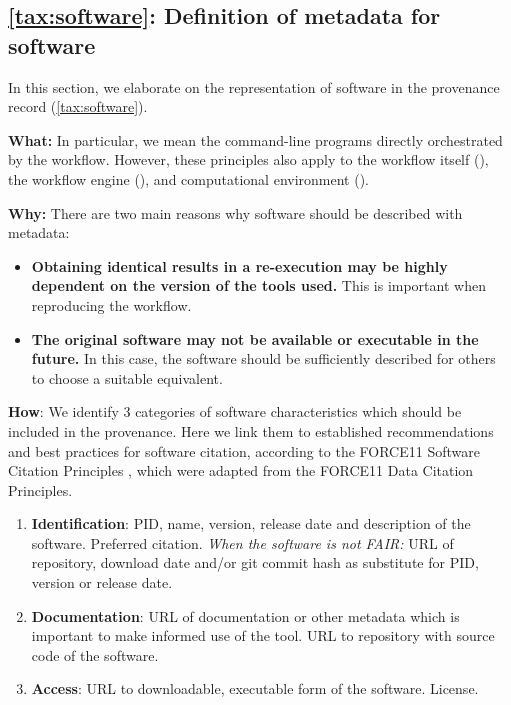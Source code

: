\subsection{\ref{tax:software}: Definition of metadata for software}
\label{sec:software_reqs}

In this section, we elaborate on the representation of software in the provenance record (\ref{tax:software}). 

\textbf{What:} In particular, we mean the command-line programs directly orchestrated by the workflow. However, these principles also apply to the workflow itself (), the workflow engine (), and computational environment ().

\textbf{Why:} There are two main reasons why software should be described with metadata:

\begin{itemize}
    \item \textbf{Obtaining identical results in a re-execution may be highly dependent on the version of the tools used.} This is important when reproducing the workflow. 
    \item \textbf{The original software may not be available or executable in the future.} In this case, the software should be sufficiently described for others to choose a suitable equivalent. 
\end{itemize}

\textbf{How}: We identify 3 categories of software characteristics which should be included in the provenance. Here we link them to established recommendations and best practices for software citation, according to the FORCE11 Software Citation Principles \cite{smithSoftwareCitationPrinciples2016}, which were adapted from the FORCE11 Data Citation Principles.

\begin{enumerate}[label=\textbf{SW\arabic*}]
    \item \textbf{Identification}: PID, name, version, release date and description of the software. Preferred citation. \textit{When the software is not FAIR:} URL of repository, download date and/or git commit hash as substitute for PID, version or release date. \label{req:sw_id}
    \item \textbf{Documentation}: URL of documentation or other metadata which is important to make informed use of the tool. URL to repository with source code of the software. \label{req:sw_doc}
    \item \textbf{Access}: URL to downloadable, executable form of the software. License. \label{req:sw_access}
\end{enumerate}
